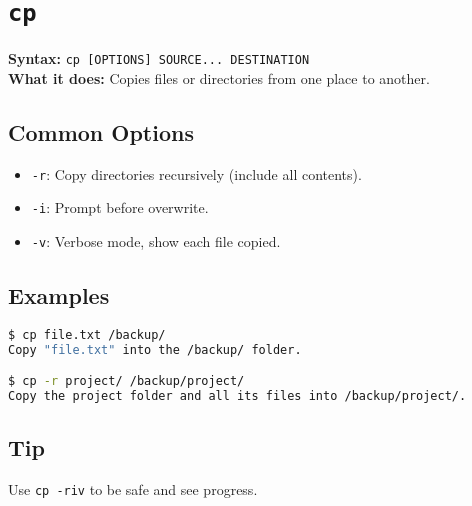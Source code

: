 \documentclass[10pt,oneside]{scrbook}
\begin{document}
\section{\texttt{cp}}
\begin{cmdbox}
  \textbf{Syntax:} \lstinline!cp [OPTIONS] SOURCE... DESTINATION! \\
  \textbf{What it does:} Copies files or directories from one place to another.
\end{cmdbox}
\begin{commanddetails}
  \subsection*{Common Options}
  \begin{itemize}
    \item \lstinline!-r!: Copy directories recursively (include all contents).
    \item \lstinline!-i!: Prompt before overwrite.
    \item \lstinline!-v!: Verbose mode, show each file copied.
  \end{itemize}

  \subsection*{Examples}
  \begin{lstlisting}[language=bash]
$ cp file.txt /backup/
Copy "file.txt" into the /backup/ folder.

$ cp -r project/ /backup/project/
Copy the project folder and all its files into /backup/project/.
  \end{lstlisting}

  \subsection*{Tip}
  Use \lstinline!cp -riv! to be safe and see progress.
\end{commanddetails}

\end{document}
